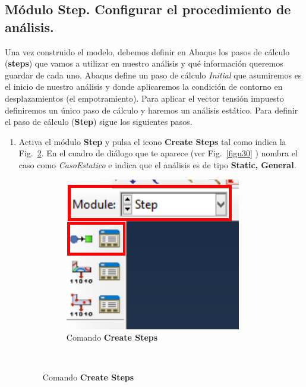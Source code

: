 \subsection{Módulo Step. Configurar el procedimiento de análisis.}
Una vez construido el modelo, debemos definir en Abaqus los pasos de
cálculo (\textbf{steps}) que vamos a utilizar en nuestro análisis y
qué información queremos guardar de cada uno. Abaqus define un paso de
cálculo \textit{Initial} que asumiremos es el inicio de nuestro
análisis y donde aplicaremos la condición de contorno en
desplazamientos (el empotramiento).  Para aplicar el vector tensión
impuesto definiremos un único paso de cálculo y haremos un análisis
estático. Para definir el paso de cálculo (\textbf{Step}) sigue
los siguientes pasos.
\begin{enumerate}
\item Activa el módulo \textbf{Step} y pulsa el icono \textbf{Create
    Steps} tal como indica la Fig.~\ref{figu29}. En el cuadro de
  diálogo que te aparece (ver Fig.~\ref{figu30} ) nombra el caso como
  \textit{CasoEstatico} e indica que el análisis es de tipo
  \textbf{Static, General}.
  \begin{figure}[H]
    \centering
    \begin{subfigure}{0.29\textwidth}
      \includegraphics[width=\textwidth]{./body/images/imagen29.pdf}
      \caption{Comando \textbf{Create Steps}}
      \label{figu29}
    \end{subfigure}%
    ~ %

\end{figure}
\end{enumerate}
